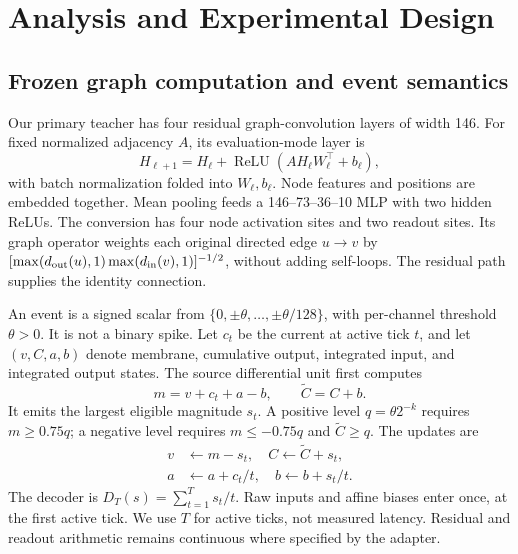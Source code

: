 \documentclass[10pt,twocolumn,letterpaper]{article}
\begin{document}
\section{Analysis and Experimental Design}
\subsection{Frozen graph computation and event semantics}
Our primary teacher has four residual graph-convolution layers of width 146. For fixed normalized adjacency $A$, its evaluation-mode layer is
\begin{equation}
 H_{\ell+1}=H_\ell+\operatorname{ReLU}(AH_\ell W_\ell^\top+b_\ell),
 \label{eq:block}
\end{equation}
with batch normalization folded into $W_\ell,b_\ell$. Node features and positions are embedded together. Mean pooling feeds a 146--73--36--10 MLP with two hidden ReLUs. The conversion has four node activation sites and two readout sites. Its graph operator weights each original directed edge $u\!\to\!v$ by $[\max(d_{\rm out}(u),1)\max(d_{\rm in}(v),1)]^{-1/2}$, without adding self-loops. The residual path supplies the identity connection.

An event is a signed scalar from $\{0,\pm\theta,\ldots,\pm\theta/128\}$, with per-channel threshold $\theta>0$. It is not a binary spike. Let $c_t$ be the current at active tick $t$, and let $(v,C,a,b)$ denote membrane, cumulative output, integrated input, and integrated output states. The source differential unit first computes
\begin{equation}
 m=v+c_t+a-b,\qquad \widetilde C=C+b.
\end{equation}
It emits the largest eligible magnitude $s_t$. A positive level $q=\theta2^{-k}$ requires $m\geq0.75q$; a negative level requires $m\leq-0.75q$ and $\widetilde C\geq q$. The updates are
\begin{equation}
\begin{split}
 v&\leftarrow m-s_t,\quad C\leftarrow\widetilde C+s_t,\\
 a&\leftarrow a+c_t/t,\quad b\leftarrow b+s_t/t.
\end{split}\label{eq:state}
\end{equation}
The decoder is $D_T(s)=\sum_{t=1}^T s_t/t$. Raw inputs and affine biases enter once, at the first active tick. We use $T$ for active ticks, not measured latency. Residual and readout arithmetic remains continuous where specified by the adapter.
\end{document}
